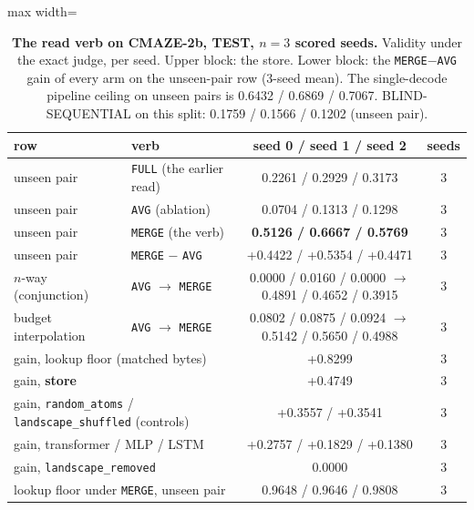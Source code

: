 \documentclass{article} %
\begin{document}
\begin{table}[t]
\centering\small
\caption{\textbf{The read verb on CMAZE-2b, TEST, $n=3$ scored seeds.} Validity under the exact
judge, per seed. Upper block: the store. Lower block: the \texttt{MERGE}$-$\texttt{AVG} gain of
every arm on the unseen-pair row (3-seed mean). The single-decode pipeline ceiling on unseen
pairs is 0.6432 / 0.6869 / 0.7067. BLIND-SEQUENTIAL on this split: 0.1759 / 0.1566 / 0.1202 %
(unseen pair).}
\label{tab:verb}
\setlength{\tabcolsep}{3pt}
\begin{adjustbox}{max width=\linewidth}\begin{tabular}{llcc}
\toprule
row & verb & seed 0 / seed 1 / seed 2 & seeds \\
\midrule
unseen pair & \texttt{FULL} (the earlier read) & 0.2261 / 0.2929 / 0.3173 & 3 \\
unseen pair & \texttt{AVG} (ablation) & 0.0704 / 0.1313 / 0.1298 & 3 \\
unseen pair & \texttt{MERGE} (the verb) & \textbf{0.5126 / 0.6667 / 0.5769} & 3 \\
unseen pair & \texttt{MERGE} $-$ \texttt{AVG} & +0.4422 / +0.5354 / +0.4471 & 3 \\
$n$-way (conjunction) & \texttt{AVG} $\to$ \texttt{MERGE} & 0.0000 / 0.0160 / 0.0000 $\to$ 0.4891 / 0.4652 / 0.3915 & 3 \\
budget interpolation & \texttt{AVG} $\to$ \texttt{MERGE} & 0.0802 / 0.0875 / 0.0924 $\to$ 0.5142 / 0.5650 / 0.4988 & 3 \\
\midrule
\multicolumn{2}{l}{gain, lookup floor (matched bytes)} & +0.8299 & 3 \\
\multicolumn{2}{l}{gain, \textbf{store}} & +0.4749 & 3 \\
\multicolumn{2}{l}{gain, \texttt{random\_atoms} / \texttt{landscape\_shuffled} (controls)} & +0.3557 / +0.3541 & 3 \\
\multicolumn{2}{l}{gain, transformer / MLP / LSTM} & +0.2757 / +0.1829 / +0.1380 & 3 \\
\multicolumn{2}{l}{gain, \texttt{landscape\_removed}} & 0.0000 & 3 \\
\multicolumn{2}{l}{lookup floor under \texttt{MERGE}, unseen pair} & 0.9648 / 0.9646 / 0.9808 & 3 \\
\bottomrule
\end{tabular}\end{adjustbox}
\end{table}
\end{document}

